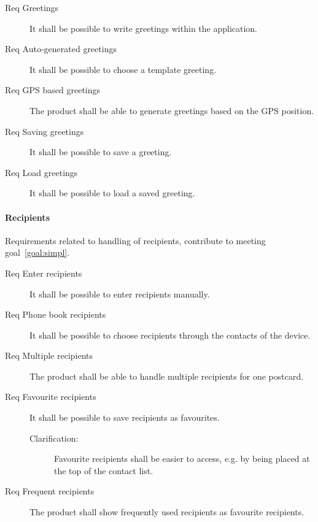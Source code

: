 \documentclass[10pt,a4paper]{article}
\begin{document}
\begin{description}
	\item [Req \thesubsubsection {} Greetings] It shall be possible to write greetings within the application.

	\item [Req \thesubsubsection {} Auto-generated greetings] It shall be possible to choose a template greeting.

	\item [Req \thesubsubsection {} GPS based greetings] The product shall be able to generate greetings based on the GPS position.

	\item [Req \thesubsubsection {} Saving greetings] It shall be possible to save a greeting.

	\item [Req \thesubsubsection {} Load greetings] It shall be possible to load a saved greeting.
\end{description}

\paragraph{Recipients}
Requirements related to handling of recipients, contribute to meeting goal~\ref{goal:simpl}.


\begin{description}
		\item [Req \thesubsubsection {} Enter recipients] It shall be possible to enter recipients manually.

	\item [Req \thesubsubsection {} Phone book recipients] It shall be possible to choose recipients through the contacts of the device.

	\item [Req \thesubsubsection {} Multiple recipients] The product shall be able to handle multiple recipients for one postcard.

	\item [Req \thesubsubsection {} Favourite recipients] It shall be possible to save recipients as favourites.
\begin{description}
	\item[Clarification:] Favourite recipients shall be easier to access, e.g. by being placed at the top of the contact list.
	\end{description}
	\item [Req \thesubsubsection {} Frequent recipients] The product shall show frequently used recipients as favourite recipients.
\end{description}
\end{document}
